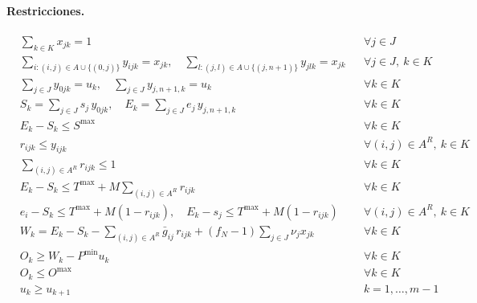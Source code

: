 \documentclass[letter, 10pt]{article}
\begin{document}
\paragraph{Restricciones.}
\begin{align}
& \sum_{k\in K} x_{jk} = 1 && \forall j\in J \label{r:cob}\\
& \sum_{i:(i,j)\in A\cup\{(0,j)\}} y_{ijk} = x_{jk},\quad \sum_{l:(j,l)\in A\cup\{(j,n+1)\}} y_{jlk} = x_{jk} && \forall j\in J,\ k\in K \label{r:flujo}\\
& \sum_{j\in J} y_{0jk} = u_k,\quad \sum_{j\in J} y_{j,n+1,k} = u_k && \forall k\in K \label{r:uso}\\
& S_k = \sum_{j\in J} s_j\, y_{0jk},\quad E_k=\sum_{j\in J} e_j\, y_{j,n+1,k} && \forall k\in K \label{r:ini}\\
& E_k - S_k \leq S^{\max} && \forall k\in K \label{r:spread}\\
& r_{ijk}\leq y_{ijk} && \forall (i,j)\in A^R,\ k\in K \label{r:rest1}\\
& \sum_{(i,j)\in A^R} r_{ijk}\leq 1 && \forall k\in K \label{r:rest2}\\
& E_k - S_k \leq T^{\max} + M\sum_{(i,j)\in A^R} r_{ijk} && \forall k\in K \label{r:sinrest}\\
& e_i - S_k \leq T^{\max} + M(1-r_{ijk}),\quad E_k - s_j \leq T^{\max} + M(1-r_{ijk}) && \forall (i,j)\in A^R,\ k\in K \label{r:stretch}\\
& W_k = E_k - S_k - \sum_{(i,j)\in A^R}\bar g_{ij}\, r_{ijk} + (f_N-1)\sum_{j\in J}\nu_j x_{jk} && \forall k\in K \label{r:trab}\\
& O_k \geq W_k - P^{\min}u_k && \forall k\in K \label{r:ot}\\
& O_k \leq O^{\max} && \forall k\in K \label{r:otmax}\\
& u_k \geq u_{k+1} && k=1,\dots,m-1 \label{r:sim}
\end{align}
\end{document}
